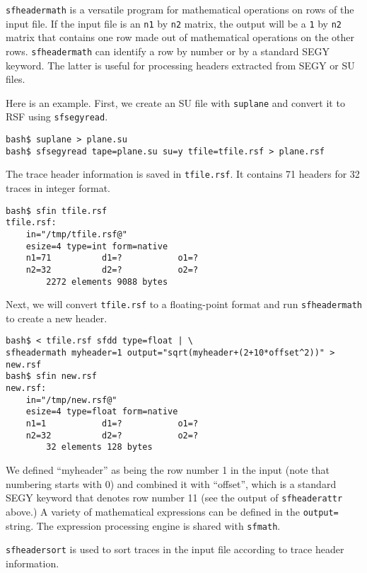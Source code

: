 \noindent\doublebox{\parbox{\textwidth}{

}}

\texttt{sfheadermath} is a versatile program for mathematical
operations on rows of the input file. If the input file is an
\texttt{n1} by \texttt{n2} matrix, the output will be a \texttt{1} by
\texttt{n2} matrix that contains one row made out of mathematical
operations on the other rows. \texttt{sfheadermath} can identify a row
by number or by a standard SEGY keyword. The latter is useful for
processing headers extracted from SEGY or SU files.

Here is an example. First, we create an SU file with \texttt{suplane} and convert it to RSF using \texttt{sfsegyread}.
\begin{verbatim}
bash$ suplane > plane.su
bash$ sfsegyread tape=plane.su su=y tfile=tfile.rsf > plane.rsf
\end{verbatim}
The trace header information is saved in \texttt{tfile.rsf}. It
contains 71 headers for 32 traces in integer format.
\begin{verbatim}
bash$ sfin tfile.rsf
tfile.rsf:
    in="/tmp/tfile.rsf@"
    esize=4 type=int form=native
    n1=71          d1=?           o1=?
    n2=32          d2=?           o2=?
        2272 elements 9088 bytes
\end{verbatim}
Next, we will convert \texttt{tfile.rsf} to a floating-point format
and run \texttt{sfheadermath} to create a new header.
\begin{verbatim}
bash$ < tfile.rsf sfdd type=float | \
sfheadermath myheader=1 output="sqrt(myheader+(2+10*offset^2))" > new.rsf
bash$ sfin new.rsf
new.rsf:
    in="/tmp/new.rsf@"
    esize=4 type=float form=native
    n1=1           d1=?           o1=?
    n2=32          d2=?           o2=?
        32 elements 128 bytes
\end{verbatim}
We defined ``myheader'' as being the row number 1 in the input (note
that numbering starts with 0) and combined it with ``offset'', which
is a standard SEGY keyword that denotes row number 11 (see the output
of \texttt{sfheaderattr} above.) A variety of mathematical expressions
can be defined in the \texttt{output=} string. The expression
processing engine is shared with \texttt{sfmath}.

\noindent\doublebox{\parbox{\textwidth}{

}}

\texttt{sfheadersort} is used to sort traces in the input file
according to trace header information. 

